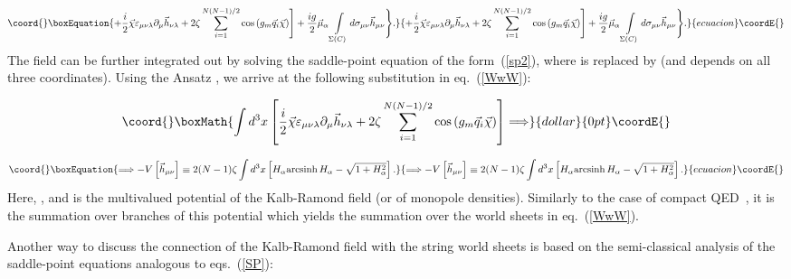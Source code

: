 \documentclass[a4paper,12pt]{article}
\begin{document}
\begin{equation}\coord{}\boxEquation{
\label{WwW}
+\frac{i}{2}\vec\chi\varepsilon_{\mu\nu\lambda}\partial_\mu\vec h_{\nu\lambda}+
2\zeta
\sum\limits_{i=1}^{N(N-1)/2}
\cos\left(g_m\vec q_i\vec\chi\right)\Biggr]+
\frac{ig}{2}\vec\mu_\alpha\int\limits_{\Sigma(C)}^{}d\sigma_{\mu\nu}\vec h_{\mu\nu}\Biggr\}.
}{
+\frac{i}{2}\vec\chi\varepsilon_{\mu\nu\lambda}\partial_\mu\vec h_{\nu\lambda}+
2\zeta
\sum\limits_{i=1}^{N(N-1)/2}
\cos\left(g_m\vec q_i\vec\chi\right)\Biggr]+
\frac{ig}{2}\vec\mu_\alpha\int\limits_{\Sigma(C)}^{}d\sigma_{\mu\nu}\vec h_{\mu\nu}\Biggr\}.
}{ecuacion}\coordE{}\end{equation}
The field \myHighlight{$\vec\chi$}\coordHE{} can be further integrated out by solving the saddle-point equation of the form~(\ref{sp2}),
where \coordHE{} is replaced by
\coordHE{} (and \myHighlight{$\vec\chi$}\coordHE{} depends on all three coordinates).
Using the Ansatz \coordHE{}, we arrive at the following substitution in eq.~(\ref{WwW}):

$$\coord{}\boxMath{
\int d^3x\left[\frac{i}{2}\vec\chi\varepsilon_{\mu\nu\lambda}\partial_\mu\vec h_{\nu\lambda}+
2\zeta
\sum\limits_{i=1}^{N(N-1)/2}
\cos\left(g_m\vec q_i\vec\chi\right)\right]\Longrightarrow}{dollar}{0pt}\coordE{}$$

\begin{equation}\coord{}\boxEquation{
\label{Vh}
\Longrightarrow -V\left[\vec h_{\mu\nu}\right]\equiv2(N-1)\zeta\int d^3x \left[H_\alpha{\rm arcsinh}{\,} H_\alpha
-\sqrt{1+H_\alpha^2}\right].
}{
\Longrightarrow -V\left[\vec h_{\mu\nu}\right]\equiv2(N-1)\zeta\int d^3x \left[H_\alpha{\rm arcsinh}{\,} H_\alpha
-\sqrt{1+H_\alpha^2}\right].
}{ecuacion}\coordE{}\end{equation}
Here, \coordHE{}, and
\coordHE{} is the
multivalued potential of the Kalb-Ramond field (or of monopole densities).
Similarly to the case of compact QED~\cite{pol}, it is the summation over branches of this potential which yields the
summation over the world sheets \coordHE{} in eq.~(\ref{WwW}).

Another way to discuss the connection of the Kalb-Ramond field with the string world sheets is based on the
semi-classical analysis of the saddle-point equations analogous to eqs.~(\ref{SP}):
\end{document}
